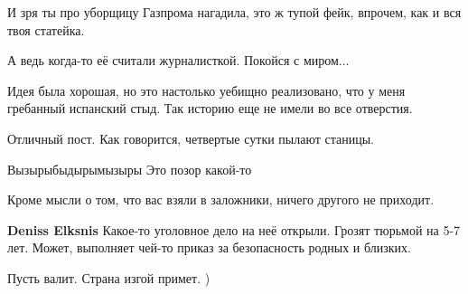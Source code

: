 \begin{itemize}
И зря ты про уборщицу Газпрома нагадила, это ж тупой фейк, впрочем, как и вся твоя статейка.

 
А ведь когда-то её считали журналисткой. Покойся с миром...

 

Идея была хорошая, но это настолько уебищно реализовано, что у меня гребанный
испанский стыд. Так историю еще не имели во все отверстия.

%
%
 
Отличный пост. Как говорится, четвертые сутки пылают станицы.

%
%
 
Вызырыбыдырымызыры
Это позор какой-то

 

Кроме мысли о том, что вас взяли в заложники, ничего другого не приходит. 🤣

\begin{itemize}
 
\textbf{Deniss Elksnis} Какое-то уголовное дело на
неё открыли. Грозят тюрьмой на 5-7 лет. Может, выполняет чей-то приказ за безопасность родных и близких.

 
Пусть валит. Страна изгой примет. )

 

\end{itemize}
\end{itemize}
